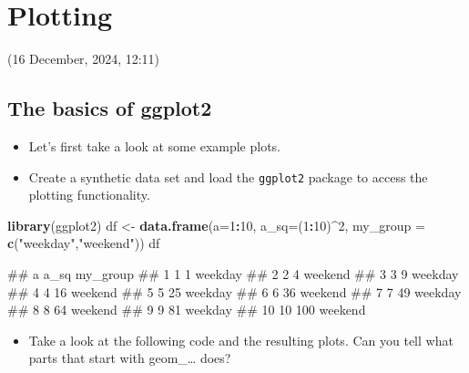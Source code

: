 \documentclass[
]{book}
\newenvironment{Shaded}{\begin{snugshade}}{\end{snugshade}}
\newcommand{\AttributeTok}[1]{\textcolor[rgb]{0.13,0.29,0.53}{#1}}
\newcommand{\DecValTok}[1]{\textcolor[rgb]{0.00,0.00,0.81}{#1}}
\newcommand{\FunctionTok}[1]{\textcolor[rgb]{0.13,0.29,0.53}{\textbf{#1}}}
\newcommand{\NormalTok}[1]{#1}
\newcommand{\OtherTok}[1]{\textcolor[rgb]{0.56,0.35,0.01}{#1}}
\newcommand{\SpecialCharTok}[1]{\textcolor[rgb]{0.81,0.36,0.00}{\textbf{#1}}}
\newcommand{\StringTok}[1]{\textcolor[rgb]{0.31,0.60,0.02}{#1}}
\providecommand{\tightlist}{%
  \setlength{\itemsep}{0pt}\setlength{\parskip}{0pt}}
\begin{document}
\chapter{Plotting}\label{plotting-1}

(16 December, 2024, 12:11)

\section{The basics of ggplot2}\label{the-basics-of-ggplot2}

\begin{itemize}
\tightlist
\item
  Let's first take a look at some example plots.
\item
  Create a synthetic data set and load the \texttt{ggplot2} package to access the plotting functionality.
\end{itemize}

\begin{Shaded}
\begin{Highlighting}[]
\FunctionTok{library}\NormalTok{(ggplot2)}
\NormalTok{df }\OtherTok{\textless{}{-}} \FunctionTok{data.frame}\NormalTok{(}\AttributeTok{a=}\DecValTok{1}\SpecialCharTok{:}\DecValTok{10}\NormalTok{, }\AttributeTok{a\_sq=}\NormalTok{(}\DecValTok{1}\SpecialCharTok{:}\DecValTok{10}\NormalTok{)}\SpecialCharTok{\^{}}\DecValTok{2}\NormalTok{, }\AttributeTok{my\_group =} \FunctionTok{c}\NormalTok{(}\StringTok{"weekday"}\NormalTok{,}\StringTok{"weekend"}\NormalTok{))}
\NormalTok{df}
\end{Highlighting}
\end{Shaded}

\begin{Shaded}
\begin{Highlighting}[]
\NormalTok{\#\#     a a\_sq my\_group}
\NormalTok{\#\# 1   1    1  weekday}
\NormalTok{\#\# 2   2    4  weekend}
\NormalTok{\#\# 3   3    9  weekday}
\NormalTok{\#\# 4   4   16  weekend}
\NormalTok{\#\# 5   5   25  weekday}
\NormalTok{\#\# 6   6   36  weekend}
\NormalTok{\#\# 7   7   49  weekday}
\NormalTok{\#\# 8   8   64  weekend}
\NormalTok{\#\# 9   9   81  weekday}
\NormalTok{\#\# 10 10  100  weekend}
\end{Highlighting}
\end{Shaded}

\begin{itemize}
\tightlist
\item
  Take a look at the following code and the resulting plots. Can you tell what parts that start with geom\_\ldots{} does?
\end{itemize}
\end{document}
